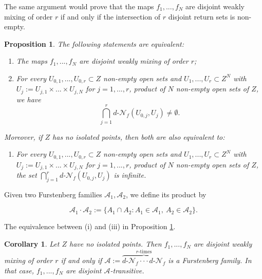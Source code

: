 \documentclass[11pt,reqno]{article}
\newtheorem{proposition}[statement]{Proposition}
\newtheorem{corollary}[statement]{Corollary}
\def\dret{d\text{-}\ret}
\def\ret{\mathcal{N}}
\begin{document}
  The same argument would prove that the maps $f_1,...,f_N$ are disjoint weakly mixing of order $r$ if and only if the intersection of $r$ disjoint return sets is non-empty.

\begin{proposition}
\label{prop:d-wm-order-r}
The following statements are equivalent:
\begin{enumerate}
    \item[\rm (i)] The maps $f_1,...,f_N$ are disjoint weakly mixing of order $r$;
    \item[\rm (ii)] For every $U_{0,1},...,U_{0,r}\subset Z$ non-empty open sets and $U_1,...,U_r\subset Z^N$ with $U_j:=U_{j,1}\times...\times U_{j,N}$ for $j=1,...,r$, product of $N$ non-empty open sets of $Z$, we have
\begin{equation*}
   \bigcap_{j=1}^r \dret_f(U_{0,j},U_j) \neq \emptyset.
\end{equation*}
\end{enumerate}

Moreover, if $Z$ has no isolated points, then both are also equivalent to:
\begin{enumerate}
\item[\rm (iii)] For every $U_{0,1},...,U_{0,r}\subset Z$ non-empty open sets and $U_1,...,U_r\subset Z^N$ with $U_j:=U_{j,1}\times...\times U_{j,N}$ for $j=1,...,r$, product of $N$ non-empty open sets of $Z$, the set $ \displaystyle \bigcap_{j=1}^r \dret_f(U_{0,j},U_j)$ is infinite.
\end{enumerate}
\end{proposition}

Given two Furstenberg families $\mathcal{A}_1, \mathcal{A}_2$, we define its product by 

\[\mathcal{A}_1 \cdot \mathcal{A}_2:= \{ A_1\cap A_2: A_1\in \mathcal{A}_1, \  A_2\in \mathcal{A}_2 \}. \]

The equivalence between (i) and (iii) in Proposition \ref{prop:d-wm-order-r}.

\begin{corollary}
    Let $Z$ have no isolated points. Then $f_1,...,f_N$ are disjoint weakly mixing of order $r$ if and only if $\mathcal{A}:= \overbrace{\dret_f \cdot \cdot \cdot \dret_f}^{r \text{-times}} $ is a Furstenberg family. In that case, $f_1,...,f_N$ are disjoint $\mathcal{A}$-transitive.
\end{corollary}
\end{document}
